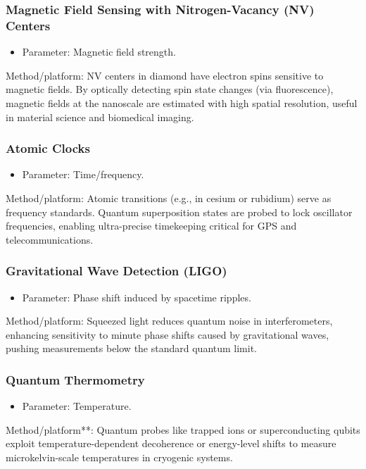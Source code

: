 \documentclass{beamer}
\begin{document}
\begin{frame}
\frametitle{Magnetic Field Sensing with Nitrogen-Vacancy (NV) Centers}

\begin{itemize}
\item Parameter: Magnetic field strength.  
\end{itemize}

\noindent
\begin{block}{}
Method/platform: NV centers in diamond have electron spins sensitive to magnetic fields.
By optically detecting spin state changes (via fluorescence), magnetic
fields at the nanoscale are estimated with high spatial resolution,
useful in material science and biomedical imaging.
\end{block}
\end{frame}

\begin{frame}
\frametitle{Atomic Clocks}

\begin{itemize}
\item Parameter: Time/frequency.  
\end{itemize}

\noindent
\begin{block}{}
Method/platform: Atomic transitions (e.g., in cesium or rubidium) serve as frequency standards. Quantum superposition states are probed to lock oscillator frequencies, enabling ultra-precise timekeeping critical for GPS and telecommunications.
\end{block}
\end{frame}

\begin{frame}
\frametitle{Gravitational Wave Detection (LIGO)}

\begin{itemize}
\item Parameter: Phase shift induced by spacetime ripples.  
\end{itemize}

\noindent
\begin{block}{}
Method/platform: Squeezed light reduces quantum noise in interferometers, enhancing sensitivity to minute phase shifts caused by gravitational waves, pushing measurements below the standard quantum limit.
\end{block}
\end{frame}

\begin{frame}
\frametitle{Quantum Thermometry}

\begin{itemize}
\item Parameter: Temperature.  
\end{itemize}

\noindent
\begin{block}{}
Method/platform**: Quantum probes like trapped ions or superconducting qubits exploit temperature-dependent decoherence or energy-level shifts to measure microkelvin-scale temperatures in cryogenic systems.
\end{block}
\end{frame}
\end{document}
